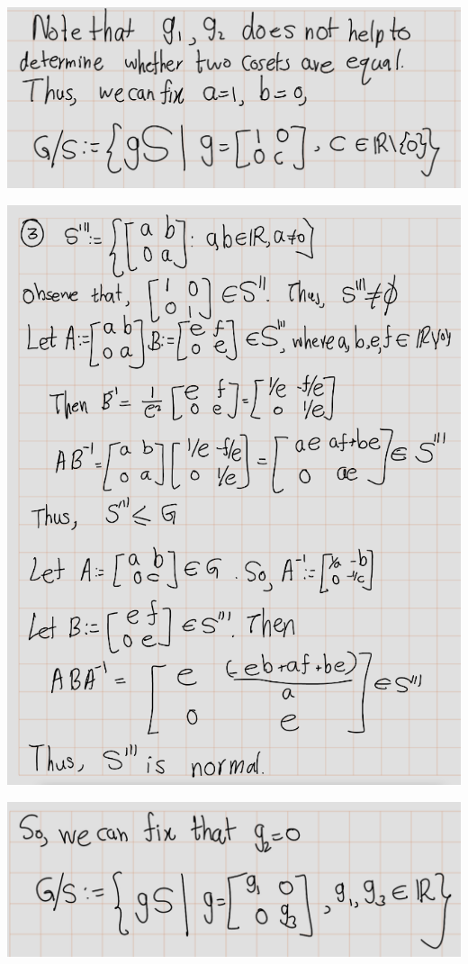 \documentclass[
]{book}
\theoremstyle{definition}
\theoremstyle{definition}
\theoremstyle{definition}
\theoremstyle{definition}
\theoremstyle{remark}
\begin{document}
\includegraphics{figures/ch_2/fig44.png}

\includegraphics{figures/ch_2/fig45.png}

\includegraphics{figures/ch_2/fig46.png}
\end{document}
